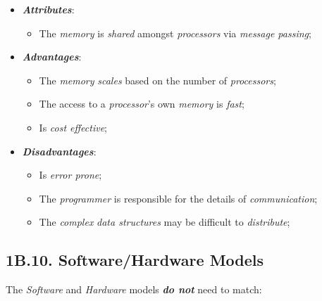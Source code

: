 \begin{itemize}
    \item \textbf{\emph{Attributes}}:
    \vspace{-0.2cm}
    \begin{itemize}
        \item The \emph{memory} is \emph{shared} amongst \emph{processors} via \emph{message passing};
    \end{itemize}
    \item \textbf{\emph{Advantages}}:
    \vspace{-0.2cm}
    \begin{itemize}
        \item The \emph{memory} \emph{scales} based on the number of \emph{processors};
        \item The access to a \emph{processor}'s own \emph{memory} is \emph{fast};
        \item Is \emph{cost effective};
    \end{itemize}
    \item \textbf{\emph{Disadvantages}}:
    \vspace{-0.2cm}
    \begin{itemize}
        \item Is \emph{error prone};
        \item The \emph{programmer} is responsible for the details of \emph{communication};
        \item The \emph{complex} \emph{data structures} may be difficult to \emph{distribute};
    \end{itemize}
\end{itemize}

\subsection*{\large{\textbf{1B.10. Software/Hardware Models}}}
\label{ssec:lecture-1B10}

\noindent The \emph{Software} and \emph{Hardware} models \textbf{\emph{do not}} need to match:

